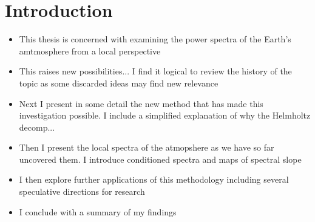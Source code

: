 \chapter{Introduction}
\label{chapter:introduction}

\begin{itemize}

\item{This thesis is concerned with examining the power spectra of the Earth's amtmosphere from a local perspective}

\item{This raises new possibilities... I find it logical to review the history of the topic as some discarded ideas may find new relevance}

\item{Next I present in some detail the new method that has made this investigation possible. I include a simplified explanation of why the Helmholtz decomp...}

\item{Then I present the local spectra of the atmopshere as we have so far uncovered them. I introduce conditioned spectra and maps of spectral slope}

\item{I then explore further applications of this methodology including several speculative directions for research}

\item{I conclude with a summary of my findings}

\end{itemize}
